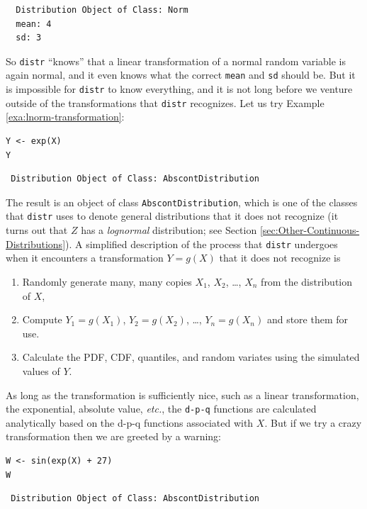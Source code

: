 \documentclass[captions=tableheading]{scrbook}
\begin{document}
\begin{verbatim}
  Distribution Object of Class: Norm
  mean: 4
  sd: 3
\end{verbatim}

So \texttt{distr} ``knows'' that a linear transformation of a normal random variable is again normal, and it even knows what the correct \texttt{mean} and \texttt{sd} should be. But it is impossible for \texttt{distr} to know everything, and it is not long before we venture outside of the transformations that \texttt{distr} recognizes. Let us try Example \ref{exa:lnorm-transformation}:


\begin{verbatim}
Y <- exp(X)
Y
\end{verbatim}

\begin{verbatim}
 Distribution Object of Class: AbscontDistribution
\end{verbatim}

The result is an object of class \texttt{AbscontDistribution}, which is one of the classes that \texttt{distr} uses to denote general distributions that it does not recognize (it turns out that \(Z\) has a \emph{lognormal} distribution; see Section \ref{sec:Other-Continuous-Distributions}). A simplified description of the process that \texttt{distr} undergoes when it encounters a transformation \(Y=g(X)\) that it does not recognize is
\begin{enumerate}
\item Randomly generate many, many copies \(X_{1}\), \(X_{2}\), \ldots{}, \(X_{n}\) from the distribution of \(X\),
\item Compute \(Y_{1}=g(X_{1})\), \(Y_{2}=g(X_{2})\), \ldots{}, \(Y_{n}=g(X_{n})\) and store them for use.
\item Calculate the PDF, CDF, quantiles, and random variates using the simulated values of \(Y\).
\end{enumerate}
As long as the transformation is sufficiently nice, such as a linear transformation, the exponential, absolute value, \emph{etc.}, the \texttt{d-p-q} functions are calculated analytically based on the d-p-q functions associated with \(X\). But if we try a crazy transformation then we are greeted by a warning:


\begin{verbatim}
W <- sin(exp(X) + 27)
W
\end{verbatim}

\begin{verbatim}
 Distribution Object of Class: AbscontDistribution
\end{verbatim}
\end{document}
